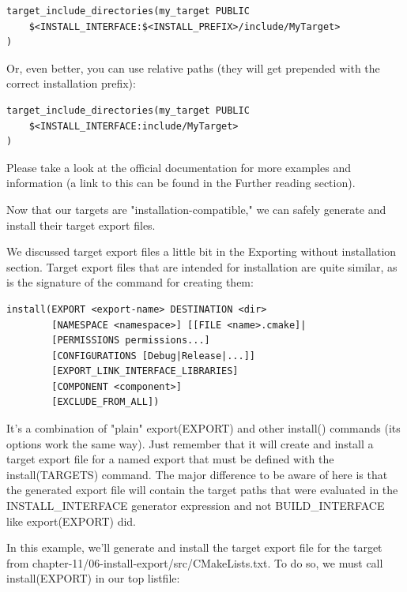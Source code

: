 \begin{lstlisting}[style=styleCMake]
target_include_directories(my_target PUBLIC
	$<INSTALL_INTERFACE:$<INSTALL_PREFIX>/include/MyTarget>
)
\end{lstlisting}

Or, even better, you can use relative paths (they will get prepended with the correct installation prefix):

\begin{lstlisting}[style=styleCMake]
target_include_directories(my_target PUBLIC
	$<INSTALL_INTERFACE:include/MyTarget>
)
\end{lstlisting}

Please take a look at the official documentation for more examples and information (a link to this can be found in the Further reading section).

Now that our targets are "installation-compatible," we can safely generate and install their target export files.


We discussed target export files a little bit in the Exporting without installation section.
Target export files that are intended for installation are quite similar, as is the signature of the command for creating them:

\begin{lstlisting}[style=styleCMake]
install(EXPORT <export-name> DESTINATION <dir>
		[NAMESPACE <namespace>] [[FILE <name>.cmake]|
		[PERMISSIONS permissions...]
		[CONFIGURATIONS [Debug|Release|...]]
		[EXPORT_LINK_INTERFACE_LIBRARIES]
		[COMPONENT <component>]
		[EXCLUDE_FROM_ALL])
\end{lstlisting}

It's a combination of "plain" export(EXPORT) and other install() commands (its options work the same way). Just remember that it will create and install a target export file for a named export that must be defined with the install(TARGETS) command. The major difference to be aware of here is that the generated export file will contain the target paths that were evaluated in the INSTALL\_INTERFACE generator expression and not BUILD\_INTERFACE like export(EXPORT) did.

In this example, we'll generate and install the target export file for the target from chapter-11/06-install-export/src/CMakeLists.txt. To do so, we must call install(EXPORT) in our top listfile:

